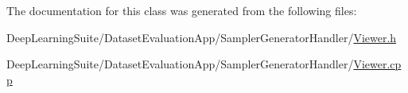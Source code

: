 The documentation for this class was generated from the following files\+:\begin{DoxyCompactItemize}
\item 
Deep\+Learning\+Suite/\+Dataset\+Evaluation\+App/\+Sampler\+Generator\+Handler/\hyperlink{_viewer_8h}{Viewer.\+h}\item 
Deep\+Learning\+Suite/\+Dataset\+Evaluation\+App/\+Sampler\+Generator\+Handler/\hyperlink{_dataset_evaluation_app_2_sampler_generator_handler_2_viewer_8cpp}{Viewer.\+cpp}\end{DoxyCompactItemize}
